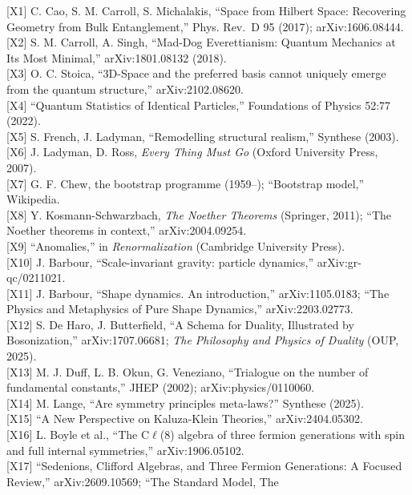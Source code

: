 \documentclass[
  a4paper,
]{article}
\begin{document}
{[}X1{]} C. Cao, S. M. Carroll, S. Michalakis, ``Space from Hilbert
Space: Recovering Geometry from Bulk Entanglement,'' Phys. Rev.~D 95
(2017); arXiv:1606.08444.\\
{[}X2{]} S. M. Carroll, A. Singh, ``Mad-Dog Everettianism: Quantum
Mechanics at Its Most Minimal,'' arXiv:1801.08132 (2018).\\
{[}X3{]} O. C. Stoica, ``3D-Space and the preferred basis cannot
uniquely emerge from the quantum structure,'' arXiv:2102.08620.\\
{[}X4{]} ``Quantum Statistics of Identical Particles,'' Foundations of
Physics 52:77 (2022).\\
{[}X5{]} S. French, J. Ladyman, ``Remodelling structural realism,''
Synthese (2003).\\
{[}X6{]} J. Ladyman, D. Ross, \emph{Every Thing Must Go} (Oxford
University Press, 2007).\\
{[}X7{]} G. F. Chew, the bootstrap programme (1959--); ``Bootstrap
model,'' Wikipedia.\\
{[}X8{]} Y. Kosmann-Schwarzbach, \emph{The Noether Theorems} (Springer,
2011); ``The Noether theorems in context,'' arXiv:2004.09254.\\
{[}X9{]} ``Anomalies,'' in \emph{Renormalization} (Cambridge University
Press).\\
{[}X10{]} J. Barbour, ``Scale-invariant gravity: particle dynamics,''
arXiv:gr-qc/0211021.\\
{[}X11{]} J. Barbour, ``Shape dynamics. An introduction,''
arXiv:1105.0183; ``The Physics and Metaphysics of Pure Shape Dynamics,''
arXiv:2203.02773.\\
{[}X12{]} S. De Haro, J. Butterfield, ``A Schema for Duality,
Illustrated by Bosonization,'' arXiv:1707.06681; \emph{The Philosophy
and Physics of Duality} (OUP, 2025).\\
{[}X13{]} M. J. Duff, L. B. Okun, G. Veneziano, ``Trialogue on the
number of fundamental constants,'' JHEP (2002); arXiv:physics/0110060.\\
{[}X14{]} M. Lange, ``Are symmetry principles meta-laws?'' Synthese
(2025).\\
{[}X15{]} ``A New Perspective on Kaluza-Klein Theories,''
arXiv:2404.05302.\\
{[}X16{]} L. Boyle et al., ``The C\(\ell\)(8) algebra of three fermion
generations with spin and full internal symmetries,''
arXiv:1906.05102.\\
{[}X17{]} ``Sedenions, Clifford Algebras, and Three Fermion Generations:
A Focused Review,'' arXiv:2609.10569; ``The Standard Model, The
\end{document}
